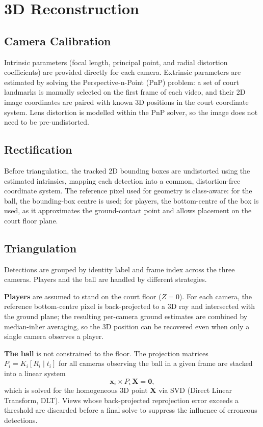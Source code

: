 \section{3D Reconstruction}\label{sec:reconstruction}

\subsection{Camera Calibration}
Intrinsic parameters (focal length, principal point, and radial distortion
coefficients) are provided directly for each camera.
Extrinsic parameters are estimated by solving the Perspective-n-Point (PnP) problem:
a set of court landmarks is manually selected on the first frame of each video, and
their 2D image coordinates are paired with known 3D positions in the court
coordinate system.
Lens distortion is modelled within the PnP solver, so the image does not need to be
pre-undistorted.

\subsection{Rectification}
Before triangulation, the tracked 2D bounding boxes are undistorted using the
estimated intrinsics, mapping each detection into a common, distortion-free
coordinate system.
The reference pixel used for geometry is class-aware: for the ball, the bounding-box
centre is used; for players, the bottom-centre of the box is used, as it
approximates the ground-contact point and allows placement on the court floor plane.

\subsection{Triangulation}
Detections are grouped by identity label and frame index across the three cameras.
Players and the ball are handled by different strategies.

\textbf{Players} are assumed to stand on the court floor ($Z=0$).
For each camera, the reference bottom-centre pixel is back-projected to a 3D ray and
intersected with the ground plane; the resulting per-camera ground estimates are
combined by median-inlier averaging, so the 3D position can be recovered even when
only a single camera observes a player.

\textbf{The ball} is not constrained to the floor. The projection matrices
$P_i = K_i [R_i \mid t_i]$ for all cameras observing the ball in a given frame are
stacked into a linear system
\begin{equation}
  \mathbf{x}_i \times P_i\,\mathbf{X} = \mathbf{0},
\end{equation}
which is solved for the homogeneous 3D point $\mathbf{X}$ via SVD (Direct Linear
Transform, DLT).
Views whose back-projected reprojection error exceeds a threshold are discarded
before a final solve to suppress the influence of erroneous detections.

